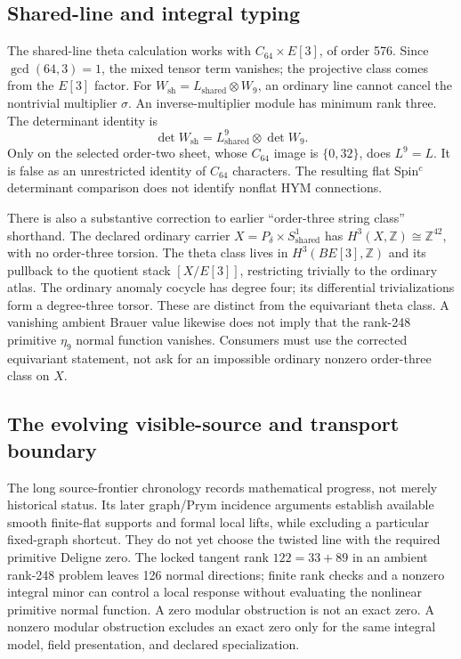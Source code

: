 \documentclass[11pt]{article}
\theoremstyle{definition}
\theoremstyle{remark}
\begin{document}
\subsection{Shared-line and integral typing}
\label{sec:shared-line}

The shared-line theta calculation \cite{FRG3AA} works with
\(C_{64}\times E[3]\), of order 576.  Since \(\gcd(64,3)=1\), the mixed
tensor term vanishes; the projective class comes from the \(E[3]\) factor.
For \(W_{\mathrm{sh}}=L_{\mathrm{shared}}\otimes W_9\), an ordinary line
cannot cancel the nontrivial multiplier \(\sigma\).  An inverse-multiplier
module has minimum rank three.  The determinant identity is
\[
\det W_{\mathrm{sh}}
=L_{\mathrm{shared}}^9\otimes\det W_9.
\]
Only on the selected order-two sheet, whose \(C_{64}\) image is
\(\{0,32\}\), does \(L^9=L\).  It is false as an unrestricted identity
of \(C_{64}\) characters.  The resulting flat Spin\(^{c}\) determinant
comparison does not identify nonflat HYM connections.

There is also a substantive correction to earlier ``order-three string
class'' shorthand.  The declared ordinary carrier
\(X=P_\delta\times S^1_{\mathrm{shared}}\) has
\(H^3(X,\mathbb Z)\cong\mathbb Z^{42}\), with no order-three torsion.
The theta class lives in \(H^3(BE[3],\mathbb Z)\) and its pullback to the
quotient stack \([X/E[3]]\), restricting trivially to the ordinary atlas.
The ordinary anomaly cocycle has degree four; its differential
trivializations form a degree-three torsor.  These are distinct from the
equivariant theta class.  A vanishing ambient Brauer value likewise does
not imply that the rank-248 primitive \(\eta_9\) normal function vanishes.
Consumers must use the corrected equivariant statement, not ask for an
impossible ordinary nonzero order-three class on \(X\).

\subsection{The evolving visible-source and transport boundary}
\label{sec:source-frontier}

The long source-frontier chronology \cite{FRFrontier} records mathematical
progress, not merely historical status.  Its later graph/Prym incidence
arguments establish available smooth finite-flat supports and formal local
lifts, while excluding a particular fixed-graph shortcut.  They do not yet
choose the twisted line with the required primitive Deligne zero.  The
locked tangent rank \(122=33+89\) in an ambient rank-248 problem leaves
126 normal directions; finite rank checks and a nonzero integral minor can
control a local response without evaluating the nonlinear primitive normal
function.  A zero modular obstruction is not an exact zero.  A nonzero
modular obstruction excludes an exact zero only for the same integral
model, field presentation, and declared specialization.
\end{document}
